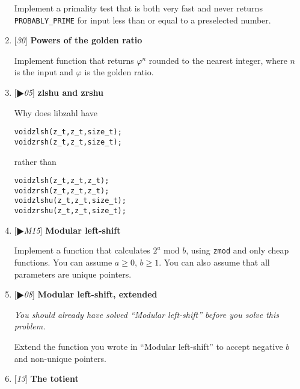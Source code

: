 \begin{enumerate}[label=\textbf{\arabic*}.]
Implement a primality test that is both very fast and
never returns \texttt{PROBABLY\_PRIME} for input less
than or equal to a preselected number.



\item {[\textit{30}]} \textbf{Powers of the golden ratio}

Implement function that returns $\varphi^n$ rounded
to the nearest integer, where $n$ is the input and
$\varphi$ is the golden ratio.



\item {[\textit{$\RHD$05}]} \textbf{zlshu and zrshu}

Why does libzahl have

\vspace{-1em}
\begin{alltt}
   void zlsh(z_t, z_t, size_t);
   void zrsh(z_t, z_t, size_t);
\end{alltt}
\vspace{-1em}

\noindent
rather than

\vspace{-1em}
\begin{alltt}
   void zlsh(z_t, z_t, z_t);
   void zrsh(z_t, z_t, z_t);
   void zlshu(z_t, z_t, size_t);
   void zrshu(z_t, z_t, size_t);
\end{alltt}
\vspace{-1em}



\item {[\textit{$\RHD$M15}]} \textbf{Modular left-shift}

Implement a function that calculates
$2^a \text{ mod } b$, using \texttt{zmod} and
only cheap functions. You can assume $a \ge 0$,
 $b \ge 1$. You can also assume that all
parameters are unique pointers.



\item {[\textit{$\RHD$08}]} \textbf{Modular left-shift, extended}

{\small\textit{You should already have solved
``Modular left-shift'' before you solve this
problem.}}

Extend the function you wrote in ``Modular left-shift''
to accept negative $b$ and non-unique pointers.



\item {[\textit{13}]} \textbf{The totient}


\end{enumerate}
